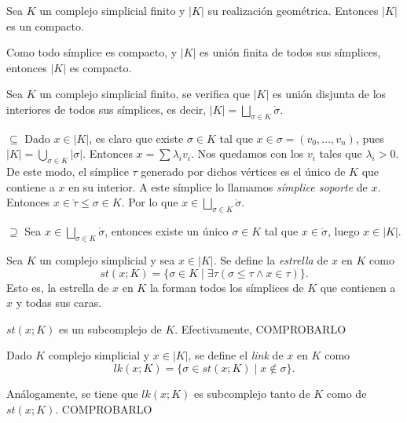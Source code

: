 \documentclass[HS.tex]{subfiles}
\begin{document}
\begin{prop}
Sea $K$ un complejo simplicial finito y $|K|$ su realización geométrica. Entonces $|K|$ es un compacto.
\end{prop}
\begin{dem}
Como todo símplice es compacto, y $|K|$ es unión finita de todos sus símplices, entonces $|K|$ es compacto. \QED
\end{dem}

\begin{lemma}
Sea $K$ un complejo simplicial finito, se verifica que $|K|$ es unión disjunta de los interiores de todos sus símplices, es decir, $|K|=\underset{\sigma\in K}\bigsqcup\mathring{\sigma}$.
\end{lemma}
\begin{dem}
$\boxed{\subseteq}$ Dado $x\in |K|$, es claro que existe $\sigma\in K$ tal que $x\in\sigma=(v_0,\dots, v_n)$, pues $|K|=\bigcup_{\sigma\in K}|\sigma|$.  Entonces $x=\sum\lambda_i v_i$. Nos quedamos con los $v_i$ tales que $\lambda_i>0$. De este modo, el símplice $\tau$ generado por dichos vértices es el único de $K$ que contiene a $x$ en su interior. A este símplice lo llamamos \emph{símplice soporte} de $x$. Entonces $x\in\mathring{\tau}\leq \sigma\in K$. Por lo que $x\in \underset{\sigma\in K}\bigsqcup\mathring{\sigma}$.

$\boxed{\supseteq}$ Sea $x\in \underset{\sigma\in K}\bigsqcup\mathring{\sigma}$, entonces existe un único $\sigma\in K$ tal que $x\in\mathring{\sigma}$, luego $x\in |K|$.
\end{dem} 

\begin{defi} Sea $K$ un complejo simplicial y sea $x\in |K|$. Se define la \emph{estrella} de $x$ en $K$ como 
\[
st(x;K)=\{\sigma\in K\mid \exists \tau (\sigma\leq \tau\land x\in\tau)\}.
\]
Esto es, la estrella de $x$ en $K$ la forman todos los símplices de $K$ que contienen a $x$ y todas sus caras.
\end{defi}

\begin{nota}
$st(x;K)$ es un subcomplejo de $K$. Efectivamente, COMPROBARLO
\end{nota}

\begin{defi}
Dado $K$ complejo simplicial y $x\in |K|$, se define el \emph{link} de $x$ en $K$ como
\[
lk(x;K)=\{\sigma\in st(x;K)\mid x\notin\sigma\}.
\]
\end{defi}

\begin{nota}
Análogamente, se tiene que $lk(x;K)$ es subcomplejo tanto de $K$ como de $st(x;K)$. COMPROBARLO
\end{nota}
\end{document}
